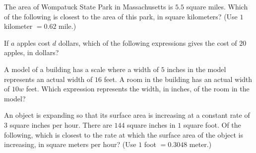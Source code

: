 \vspace{2em}

\noindent\markforreview
\vspace{1em}

The area of Wompatuck State Park in Massachusetts is \(5.5\) square miles.  
Which of the following is closest to the area of this park, in square kilometers?  
(Use \(1\) kilometer \(= 0.62\) mile.)


\vspace{2em}

\noindent\markforreview
\vspace{1em}

If \(a\) apples cost \(d\) dollars, which of the following expressions gives the cost of \(20\) apples, in dollars?


\vspace{2em}

\noindent\markforreview
\vspace{1em}

A model of a building has a scale where a width of \(5\) inches in the model represents an actual width of \(16\) feet.  
A room in the building has an actual width of \(10w\) feet.  
Which expression represents the width, in inches, of the room in the model?


\vspace{2em}

\noindent\markforreview
\vspace{1em}

An object is expanding so that its surface area is increasing at a constant rate of \(3\) square inches per hour.  
There are \(144\) square inches in \(1\) square foot.  
Of the following, which is closest to the rate at which the surface area of the object is increasing,  
in square meters per hour? (Use \(1\) foot \(= 0.3048\) meter.)


\vspace{2em}

